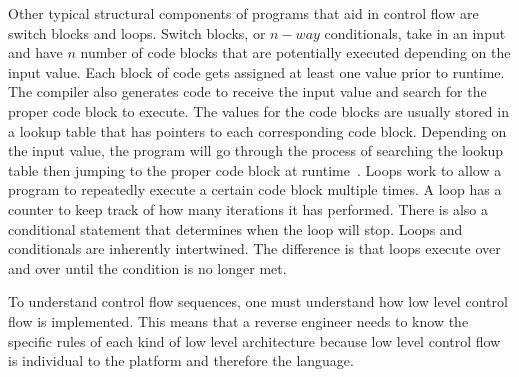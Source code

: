 Other typical structural components of programs that aid in control flow are switch blocks and loops. 
Switch blocks, or \(n-way\) conditionals, take in an input and have \(n\) number of code blocks that are potentially executed depending on the input value. 
Each block of code gets assigned at least one value prior to runtime. 
The compiler also generates code to receive the input value and search for the proper code block to execute. 
The values for the code blocks are usually stored in a lookup table that has pointers to each corresponding code block.  
Depending on the input value, the program will go through the process of searching the lookup table then jumping to the proper code block at runtime~\cite{Reversing}. 
Loops work to allow a program to repeatedly execute a certain code block multiple times. A loop has a counter to keep track of how many iterations it has performed. 
There is also a conditional statement that determines when the loop will stop. 
Loops and conditionals are inherently intertwined. 
The difference is that loops execute over and over until the condition is no longer met.

To understand control flow sequences, one must understand how low level control flow is implemented. 
This means that a reverse engineer needs to know the specific rules of each kind of low level architecture because low level control flow is individual to the platform and therefore the language.

